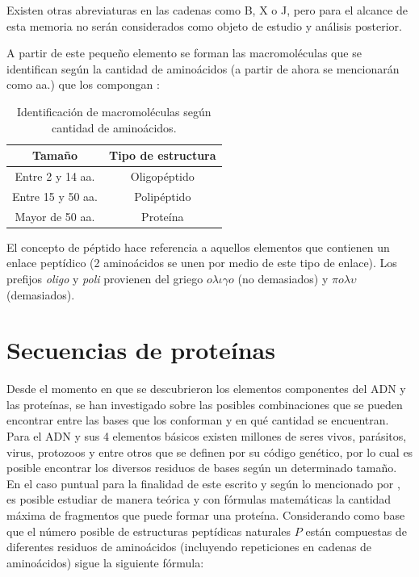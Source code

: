 Existen otras abreviaturas en las cadenas como B, X o J, pero para el alcance de esta memoria no serán considerados como objeto de estudio y análisis posterior.

A partir de este pequeño elemento se forman las macromoléculas que se identifican según la cantidad de aminoácidos (a partir de ahora se mencionarán como aa.) que los compongan \cite{array}:

\begin{table}[H]
\centering
\label{my-label1}
\begin{tabular}{|c|c|}
\hline
Tamaño & \multicolumn{1}{c|}{Tipo de estructura}  \\ \hline
Entre 2 y 14 aa.      &      Oligopéptido                             \\
Entre 15 y 50 aa.      &   Polipéptido      \\
Mayor de 50 aa.   &   Proteína            \\ \hline
\end{tabular}
\caption{Identificación de macromoléculas según cantidad de aminoácidos.}
\end{table}

El concepto de péptido \cite{array} hace referencia a aquellos elementos que contienen un enlace peptídico (2 aminoácidos se unen por medio de este tipo de enlace). Los prefijos \textit{oligo} y \textit{poli} provienen del griego $o \lambda \iota \gamma o$ (no demasiados) y $\pi o \lambda \upsilon$ (demasiados).

\section{Secuencias de proteínas}

Desde el momento en que se descubrieron los elementos componentes del ADN y las proteínas, se han investigado sobre las posibles combinaciones que se pueden encontrar entre las bases que los conforman y en qué cantidad se encuentran. Para el ADN y sus 4 elementos básicos existen millones de seres vivos, parásitos, virus, protozoos y entre otros que se definen por su código genético, por lo cual es posible encontrar los diversos residuos de bases según un determinado tamaño. En el caso puntual para la finalidad de este escrito y según lo mencionado por \cite{zamyatnin1}, es posible estudiar de manera teórica y con fórmulas matemáticas la cantidad máxima de fragmentos que puede formar una proteína. Considerando como base que el número posible de estructuras peptídicas naturales $P$ están compuestas de diferentes residuos de aminoácidos (incluyendo repeticiones en cadenas de aminoácidos) sigue la siguiente fórmula:

